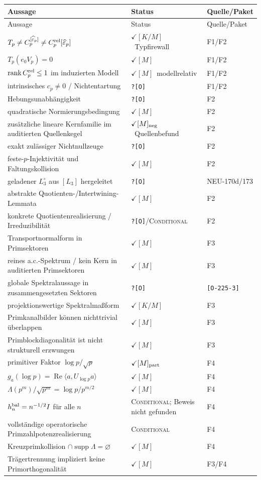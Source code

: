 \documentclass[11pt,a4paper]{amsart}
\newcommand{\stM}{\ensuremath{\checkmark[M]}}
\newcommand{\stKM}{\ensuremath{\checkmark[K/M]}}
\newcommand{\stMneg}{\ensuremath{\checkmark[M]_{\rm neg}}}
\newcommand{\stMpart}{\ensuremath{\checkmark[M]_{\rm part}}}
\newcommand{\Open}{\texttt{?[O]}}
\newcommand{\Conditional}{\textsc{Conditional}}
\begin{document}
\small
\begin{longtable}{>{\raggedright\arraybackslash}p{}
>{\raggedright\arraybackslash}p{}
>{\raggedright\arraybackslash}p{}}
\toprule
Aussage & Status & Quelle/Paket\\
\midrule
\endfirsthead
\toprule
Aussage & Status & Quelle/Paket\\
\midrule
\endhead
$T_p\neq C_p^{[\widehat\varepsilon_p]}\neq C_p^{\rm rel}[\widehat\varepsilon_p]$
& \stKM\ Typfirewall & F1/F2\\
$T_p(e_0V_p)=0$ & \stM & F1/F2\\
$\operatorname{rank}C_p^{\rm rel}\le1$ im induzierten Modell
& \stM\ modellrelativ & F1/F2\\
intrinsisches $c_p\neq0$ / Nichtentartung & \Open & F1/F2\\
Hebungsunabhängigkeit & \Open & F2\\
quadratische Normierungsbedingung & \stM & F2\\
zusätzliche lineare Kernfamilie im auditierten Quellenkegel
& \stMneg\ Quellenbefund & F2\\
exakt zulässiger Nichtnullzeuge & \Open & F2\\
feste-$p$-Injektivität und Faltungskollision & \stM & F2\\
geladener $L_3^\circ$ aus $[L_3]$ hergeleitet & \Open & NEU-170d/173\\
abstrakte Quotienten-/Intertwining-Lemmata & \stM & F2\\
konkrete Quotientenrealisierung / Irreduzibilität
& \Open/\Conditional & F2\\
Transportnormalform in Primsektoren & \stM & F3\\
reines a.c.-Spektrum / kein Kern in auditierten Primsektoren & \stM & F3\\
globale Spektralaussage in zusammengesetzten Sektoren
& \Open & \texttt{[O-225-3]}\\
projektionswertige Spektralmaßform & \stKM & F3\\
Primkanalbilder können nichttrivial überlappen & \stM & F3\\
Primblockdiagonalität ist nicht strukturell erzwungen & \stM & F3\\
primitiver Faktor $\log p/\sqrt p$ & \stMpart & F4\\
$g_a(\log p)=\operatorname{Re}\langle a,U_{\log p}a\rangle$ & \stM & F4\\
$\Lambda(p^m)/\sqrt{p^m}=\log p/p^{m/2}$ & \stM & F4\\
$h_n^{\rm bal}=n^{-1/2}I$ für alle $n$
& \Conditional; Beweis nicht gefunden & F4\\
vollständige operatorische Primzahlpotenzrealisierung & \Conditional & F4\\
Kreuzprimkollision $\cap\operatorname{supp}\Lambda=\varnothing$ & \stM & F4\\
Trägertrennung impliziert keine Primorthogonalität & \stM & F3/F4\\
\bottomrule
\end{longtable}
\normalsize
\end{document}
